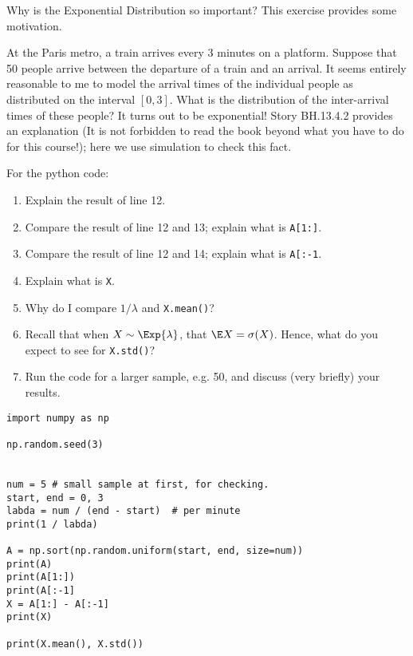 \documentclass[assignments]{subfiles}
\begin{document}
\begin{exercise}
Why is the Exponential Distribution so important? This exercise provides some motivation.


At the Paris metro, a  train arrives every  3  minutes on a platform. Suppose that 50 people arrive between the departure of a train and an arrival.
It seems entirely reasonable to me to model the arrival times of the individual people as distributed on the interval \([0,3]\).
What is the distribution of the inter-arrival times of these people? It turns out to be exponential!  Story BH.13.4.2 provides an explanation (It is not forbidden to read the book beyond what you have to do for this course!); here we use simulation to check this fact. 

For the python code:
\begin{enumerate}
\item Explain the result of line 12.
\item Compare the result of  line 12 and 13;  explain what is \texttt{A[1:]}.
\item Compare the result of  line 12 and 14;  explain what is \texttt{A[:-1}.
\item Explain what is \texttt{X}.
\item Why do I compare $1/\lambda$ and \texttt{X.mean()}?
\item Recall that when $X\sim \Exp{\lambda}$, that $\E X = \sigma (X)$. Hence, what do you expect to see for  \texttt{X.std()}?
\item Run the code for a larger sample, e.g. 50, and discuss (very briefly) your results.
\end{enumerate}


\begin{verbatim}
import numpy as np

np.random.seed(3)


num = 5 # small sample at first, for checking.
start, end = 0, 3
labda = num / (end - start)  # per minute
print(1 / labda)

A = np.sort(np.random.uniform(start, end, size=num))
print(A)
print(A[1:])
print(A[:-1]
X = A[1:] - A[:-1]
print(X)

print(X.mean(), X.std())
\end{verbatim}

\end{exercise}
\end{document}
